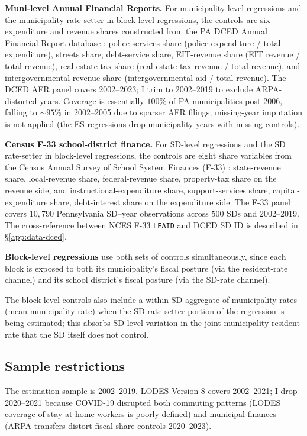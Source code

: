 \documentclass[12pt]{article}
\begin{document}
\textbf{Muni-level Annual Financial Reports.} For municipality-level
regressions and the municipality rate-setter in block-level regressions, the
controls are six expenditure and revenue shares constructed from
the PA DCED Annual Financial Report database \citep{padcedAFR}:
police-services share (police expenditure / total expenditure),
streets share, debt-service share,
EIT-revenue share (EIT revenue / total revenue),
real-estate-tax share (real-estate tax revenue / total revenue), and
intergovernmental-revenue share (intergovernmental aid / total revenue).
The DCED AFR panel covers 2002--2023; I trim to 2002--2019 to
exclude ARPA-distorted years. Coverage is essentially $100\%$ of
PA municipalities post-2006, falling to ${\sim}95\%$ in 2002--2005 due to
sparser AFR filings; missing-year imputation is not applied (the
ES regressions drop municipality-years with missing controls).

\textbf{Census F-33 school-district finance.} For SD-level
regressions and the SD rate-setter in block-level regressions, the
controls are eight share variables from the Census Annual Survey of
School System Finances (F-33) \citep{censusF33}:
state-revenue share, local-revenue share,
federal-revenue share, property-tax share
on the revenue side, and instructional-expenditure share,
support-services share, capital-expenditure share,
debt-interest share on the expenditure side. The F-33
panel covers $10{,}790$ Pennsylvania SD--year observations across
$500$ SDs and 2002--2019. The cross-reference between NCES F-33
\texttt{LEAID} and DCED SD ID is described in
\S\ref{app:data-dced}.

\textbf{Block-level regressions} use both sets of controls
simultaneously, since each block is exposed to both its municipality's
fiscal posture (via the resident-rate channel) and its school
district's fiscal posture (via the SD-rate channel).

The block-level controls also include a within-SD aggregate of municipality
rates (mean municipality rate) when the SD rate-setter portion of the regression
is being estimated; this absorbs SD-level variation in the joint
municipality resident rate that the SD itself does not control.

\subsection{Sample restrictions}
\label{app:data-sample}

The estimation sample is 2002--2019. LODES Version 8 covers
2002--2021; I drop 2020--2021 because COVID-19 disrupted both
commuting patterns (LODES coverage of stay-at-home workers is
poorly defined) and municipal finances (ARPA transfers distort
fiscal-share controls 2020--2023).
\end{document}
